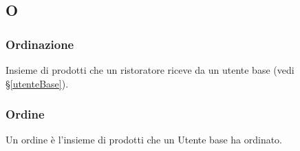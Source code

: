 \subsection{O}

\subsubsection{Ordinazione}
Insieme di prodotti che un ristoratore riceve da un utente base (vedi
\S\ref{utenteBase}).

\subsubsection{Ordine}
\label{ordine}
Un ordine è l'insieme di prodotti che un Utente base ha ordinato.

\newpage
